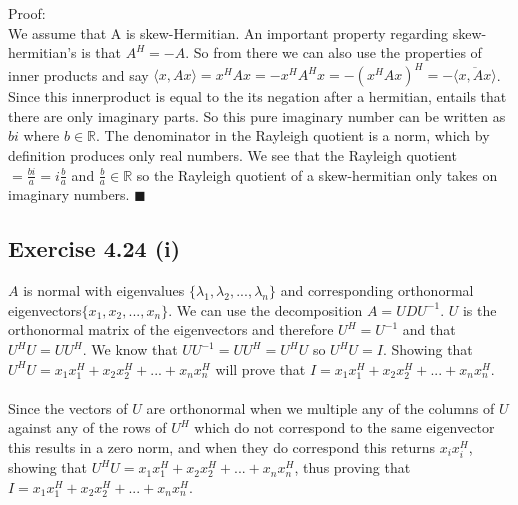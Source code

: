 \documentclass[letterpaper,12pt]{article}
\theoremstyle{definition}
\begin{document}
Proof:\\
We assume that A is skew-Hermitian. An important property regarding skew-hermitian's is that $A^H=-A$. So from there we can also use the properties of inner products and say $\langle x, Ax\rangle = x^HAx = -x^HA^Hx = -(x^HAx)^H  = -\overline{\langle x,Ax\rangle}$. Since this innerproduct is equal to the its negation after a hermitian, entails that there are only imaginary parts. So this pure imaginary number can be written as $bi$ where $b\in \mathbb{R}$. The denominator in the Rayleigh quotient is a norm, which by definition produces only real numbers. We see that the Rayleigh quotient $=\frac{bi}{a} = i\frac{b}{a}$ and $\frac{b}{a}\in \mathbb{R}$ so the Rayleigh quotient of a skew-hermitian only takes on imaginary numbers. \hfill $\blacksquare$\\

\subsection*{Exercise 4.24 (i)}
$A$ is normal with eigenvalues $\{\lambda_{1},\lambda_{2},...,\lambda_{n}\}$ and corresponding orthonormal eigenvectors$\{x_{1}, x_{2},..., x_{n}\}$. We can use the decomposition $A = UDU^{-1}$. $U$ is the orthonormal matrix of the eigenvectors and therefore $U^{H}=U^{-1}$ and that$U^{H}U = UU^{H}$. We know that $UU^{-1} = UU^{H} = U^{H}U$ so $U^{H}U = I$. Showing that $U^{H}U = x_{1}x_{1}^{H} + x_{2}x_{2}^{H} + ... + x_{n}x_{n}^{H}$ will prove that $I = x_{1}x_{1}^{H} + x_{2}x_{2}^{H} + ... + x_{n}x_{n}^{H}$. \\ \\
Since the vectors of $U$ are orthonormal when we multiple any of the columns of $U$ against any of the rows of $U^{H}$ which do not correspond to the same eigenvector this results in a zero norm, and when they do correspond this returns $x_{i}x_{i}^{H}$, showing that $U^{H}U = x_{1}x_{1}^{H} + x_{2}x_{2}^{H} + ... + x_{n}x_{n}^{H}$, thus proving that $I = x_{1}x_{1}^{H} + x_{2}x_{2}^{H} + ... + x_{n}x_{n}^{H}$. \\ 
\end{document}
